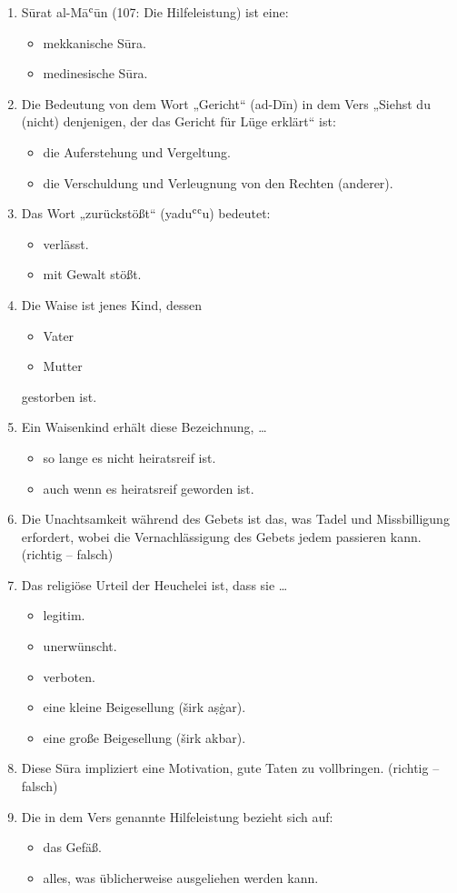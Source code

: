 \begin{enumerate}[leftmargin=1.6em,resume]
\item Sūrat al-Māʿūn (107: Die Hilfeleistung) ist eine:
  \begin{itemize}
    \item mekkanische Sūra. \item medinesische Sūra.
  \end{itemize}
\item Die Bedeutung von dem Wort „Gericht“ (ad-Dīn) in dem Vers „Siehst du (nicht) denjenigen,
  der das Gericht für Lüge erklärt“ ist:
  \begin{itemize}
    \item die Auferstehung und Vergeltung.
    \item die Verschuldung und Verleugnung von den Rechten (anderer).
  \end{itemize}
\item Das Wort „zurückstößt“ (yaduʿʿu) bedeutet:
  \begin{itemize}
    \item verlässt. \item mit Gewalt stößt.
  \end{itemize}
\item Die Waise ist jenes Kind, dessen
  \begin{itemize}
    \item Vater \item Mutter
  \end{itemize}
  gestorben ist.
\item Ein Waisenkind erhält diese Bezeichnung, \ldots{}
  \begin{itemize}
    \item so lange es nicht heiratsreif ist.
    \item auch wenn es heiratsreif geworden ist.
  \end{itemize}
\item Die Unachtsamkeit während des Gebets ist das, was Tadel und Missbilligung erfordert,
  wobei die Vernachlässigung des Gebets jedem passieren kann. (richtig -- falsch)
\item Das religiöse Urteil der Heuchelei ist, dass sie \ldots{}
  \begin{itemize}
    \item legitim. \item unerwünscht. \item verboten.
    \item eine kleine Beigesellung (širk aṣġar). \item eine große Beigesellung (širk akbar).
  \end{itemize}
\item Diese Sūra impliziert eine Motivation, gute Taten zu vollbringen. (richtig -- falsch)
\item Die in dem Vers genannte Hilfeleistung bezieht sich auf:
  \begin{itemize}
    \item das Gefäß. \item alles, was üblicherweise ausgeliehen werden kann.
  \end{itemize}
\end{enumerate}

